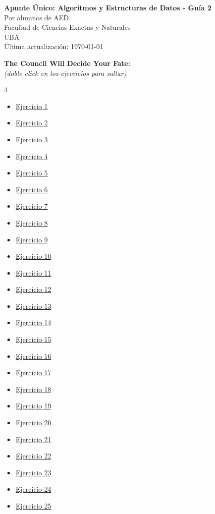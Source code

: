 


\begin{center}
    \Huge \textbf{Apunte Único: Algoritmos y Estructuras de Datos - Guía 2} \\
    \vspace{0.5cm}
    \Large Por alumnos de AED \\
    \normalsize Facultad de Ciencias Exactas y Naturales \\
    UBA \\
    \vspace{0.3cm}
    \small Última actualización: \today
\end{center}
\vspace{1cm}

\hypertarget{indice}{}
\noindent\textbf{\Large The Council Will Decide Your Fate:} \\
\textit{(doble click en los ejercicios para saltar)}

\begin{multicols}{4}
\begin{itemize}
    \item \hyperlink{ej1}{Ejercicio 1}
    \item \hyperlink{ej2}{Ejercicio 2}
    \item \hyperlink{ej3}{Ejercicio 3}
    \item \hyperlink{ej4}{Ejercicio 4}
    \item \hyperlink{ej5}{Ejercicio 5}
    \item \hyperlink{ej6}{Ejercicio 6}
    \item \hyperlink{ej7}{Ejercicio 7}
    \item \hyperlink{ej8}{Ejercicio 8}
    \item \hyperlink{ej9}{Ejercicio 9}
    \item \hyperlink{ej10}{Ejercicio 10}
    \item \hyperlink{ej11}{Ejercicio 11}
    \item \hyperlink{ej12}{Ejercicio 12}
    \item \hyperlink{ej13}{Ejercicio 13}
    \item \hyperlink{ej14}{Ejercicio 14}
    \item \hyperlink{ej15}{Ejercicio 15}
    \item \hyperlink{ej16}{Ejercicio 16}
    \item \hyperlink{ej17}{Ejercicio 17}
    \item \hyperlink{ej18}{Ejercicio 18}
    \item \hyperlink{ej19}{Ejercicio 19}
    \item \hyperlink{ej20}{Ejercicio 20}
    \item \hyperlink{ej21}{Ejercicio 21}
    \item \hyperlink{ej22}{Ejercicio 22}
    \item \hyperlink{ej23}{Ejercicio 23}
    \item \hyperlink{ej24}{Ejercicio 24}
    \item \hyperlink{ej25}{Ejercicio 25}
\end{itemize}
\end{multicols}

